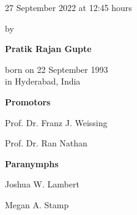 \begin{titlepage}
\begin{addmargin}[-1cm]{-3cm}
\begin{center}
{            \vspace{3mm}

            27 September 2022 at 12:45 hours

            \vspace{10mm}

            by

            \vspace{10mm}

            \textbf{Pratik Rajan Gupte}

            \vspace{3mm}

            born on 22 September 1993\\
            in Hyderabad, India
        }

    \end{center}

    \pagebreak
    \thispagestyle{empty}

    \textbf{Promotors}
    \begin{description}
        \item Prof. Dr. Franz J. Weissing
        \item Prof. Dr. Ran Nathan
    \end{description}



    \vfill

    \textbf{Paranymphs}
    \begin{description}
        \item Joshua W. Lambert
        \item Megan A. Stamp
    \end{description}

  \end{addmargin}

\end{titlepage}


    

